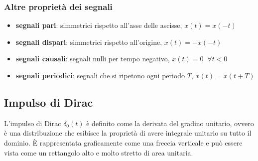 \documentclass[a4paper]{article}
\begin{document}
\subsubsection*{Altre proprietà dei segnali}
\begin{itemize}
	\item \textbf{segnali pari}: simmetrici rispetto all'asse delle ascisse, \(x(t) = x(-t)\)
	\item \textbf{segnali dispari}: simmetrici rispetto all'origine, \(x(t) = -x(-t)\)
	\item \textbf{segnali causali}: segnali nulli per tempo negativo, \(x(t) = 0 \;\; \forall t < 0\)
	\item \textbf{segnali periodici}: segnali che si ripetono ogni periodo \(T\), \(x(t) = x(t+T)\)
\end{itemize}

\subsection{Impulso di Dirac}
L'impulso di Dirac \(\delta_0(t)\) è definito come la derivata del gradino unitario, ovvero è una distribuzione che esibisce la proprietà di
avere integrale unitario su tutto il dominio. È rappresentata graficamente come una freccia verticale e può essere vista come un
rettangolo alto e molto stretto di area unitaria.
\end{document}
